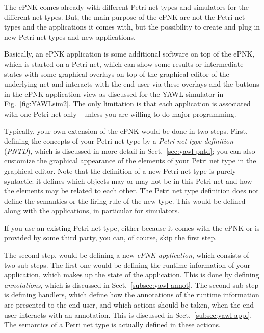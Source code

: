 \documentclass[a4paper]{llncs}
\begin{document}
The ePNK comes already with different Petri net types and simulators for
the different net types.
But, the main purpose of the ePNK are not the Petri net types and the applications
it comes with, but the possibility to create and plug in new Petri net types and
new applications.

Basically, an ePNK application is some additional software on top of the ePNK, which
is started on a Petri net, which can show some results or intermediate states
with some graphical overlays on top of the graphical editor of the underlying net
and interacts with the end user via these overlays and the buttons in
the ePNK application view as discussed for the YAWL simulator in Fig.~\ref{fig:YAWLsim2}.
The only limitation is that each application is associated with one Petri net
only---unless you are willing to do major programming.

Typically, your own extension of the ePNK would be done in two steps.
First, defining the
concepts of your Petri net type by a \emph{Petri net type definition}
(\emph{PNTD}), which is discussed in more detail in Sect.~\ref{sec:yawl-pntd};
you can also customize the graphical appearance of the elements of your Petri net type
in the graphical editor. Note that the definition of a new Petri net type
is purely syntactic: it defines which objects may or may not be in this
Petri net and how the elements may be related to each other.
The Petri net type definition does not define the semantics or the firing rule
of the new type. This would be defined along with the applications,
in particular for simulators.

If you use an existing Petri net type, either because it comes with the
ePNK or is provided by some third party, you can, of course, skip the first step. 

The second step, would be defining a new \emph{ePNK application}, which consists
of two sub-steps. The first one would be defining the runtime information of
your application, which makes up the state of the application. This is
done by defining \emph{annotations}, which is discussed in
Sect.~\ref{subsec:yawl-annot}. The second sub-step is defining handlers, which
define how the annotations of the runtime information are presented to
the end user, and which actions should be taken, when the
end user interacts with an annotation. This is discussed in
Sect.~\ref{subsec:yawl-appl}. The semantics of a Petri net type is actually
defined in these actions. 
\end{document}
